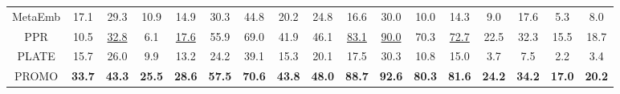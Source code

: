 \documentclass[sigconf]{acmart}
\newcommand{\sys}{\textsc{PROMO}\xspace}
\begin{document}
\begin{table}[t]
{\begin{tabular}{c cccc cccc cccc cccc}
    MetaEmb             & 17.1            & 29.3                        & 10.9            & 14.9                       & 30.3            & 44.8                        & 20.2           & 24.8                     & 16.6            & 30.0                     & 10.0            & 14.3                    & 9.0            & 17.6                       & 5.3            & 8.0          \\
    PPR           & 10.5            & \underline{32.8}                         & 6.1            & \underline{17.6}                      & 55.9            & 69.0                 & 41.9            & 46.1                         & \underline{83.1}            & \underline{90.0}                        & 70.3            & \underline{72.7}                    & 22.5            & 32.3                      & 15.5            & 18.7          \\
    PLATE              & 15.7            & 26.0                      & 9.9            & 13.2                  & 24.2            & 39.1                    & 15.3            & 20.1                   & 17.5            & 30.3                      & 10.8            & 15.0                      & 3.7           & 7.5                     & 2.2            & 3.4        \\ \midrule
\sys                & \textbf{33.7}            & \textbf{43.3}                       & \textbf{25.5}            & \textbf{28.6}                       & \textbf{57.5}            & \textbf{70.6}                      & \textbf{43.8}            & \textbf{48.0}                         & \textbf{88.7}            & \textbf{92.6}                      & \textbf{80.3}            & \textbf{81.6}                    & \textbf{24.2}            & \textbf{34.2}                       & \textbf{17.0}            & \textbf{20.2}          \\ \bottomrule
    \end{tabular}%
    }
    \end{table}
\end{document}
